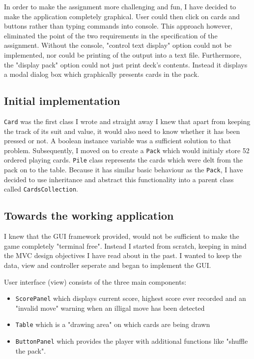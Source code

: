 \documentclass[a4paper, 12pt, titlepage]{article}
\begin{document}
In order to make the assignment more challenging and fun, I have decided to make the 
application completely graphical. User could then click on cards and buttons rather than
typing commands into console. This approach however, eliminated the point of the two 
requirements in the specification of the assignment. Without the console, "control text
display" option could not be implemented, nor could be printing of the output into a 
text file. Furthermore, the "display pack" option could not just print deck's contents.
Instead it displays a modal dialog box which graphically presents cards in the pack.

\subsection{Initial implementation}
\texttt{Card} was the first class I wrote and straight away I knew that apart from 
keeping the track of its suit and value, it would also need to know whether it has been
pressed or not. A boolean instance variable was a sufficient solution to that problem. 
Subsequently, I moved on to create a \texttt{Pack} which would initialy store 52 ordered
playing cards. \texttt{Pile} class represents the cards which were delt from the pack
on to the table. Because it has similar basic behaviour as the \texttt{Pack}, I have
decided to use inheritance and abstract this functionality into a parent class called
\texttt{CardsCollection}. 

\subsection{Towards the working application}
I knew that the GUI framework provided, would not be sufficient to make the game 
completely "terminal free". Instead I started from scratch, keeping in mind the MVC 
design objectives I have read about in the past. I wanted to keep the data, view and 
controller seperate and began to implement the GUI. 

User interface (view) consists of the three main components:
\begin{itemize}
	\item \texttt{ScorePanel} which displays current score, highest score ever recorded
		and an "invalid move" warning when an illigal move has been detected
	
	\item \texttt{Table} which is a "drawing area" on which cards are being drawn
	
	\item \texttt{ButtonPanel} which provides the player with additional functions like
		"shuffle the pack". 
\end{itemize}
\end{document}
